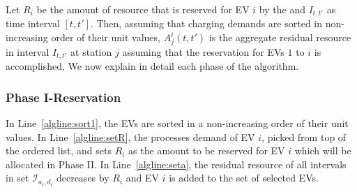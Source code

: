 Let $R_i$ be the amount of resource that is reserved for EV $i$ by the \fcs and $I_{t,t'}$ as time interval $[t,t']$.
Then, assuming that charging demands are sorted in non-increasing order of their unit values, $A^i_j(t,t')$ is the aggregate residual resource in interval $I_{t,t'}$ at station $j$ assuming that the reservation for EVs $1$ to $i$ is accomplished. We now explain in detail each phase of the algorithm. 


\subsubsection{Phase I-Reservation\label{sec:ph1}} In Line~\ref{algline:sort1}, the EVs are sorted in a non-increasing order of their unit values.  
In Line~\ref{algline:setR}, the \fcs processes demand of EV $i$, picked from top of the ordered list, and sets $R_i$ as the amount to be reserved for EV $i$ which will be allocated in Phase II. In Line~\ref{algline:seta}, the residual resource of all intervals in set $\mathcal{I}_{a_i,d_i}$ decreases by $R_i$ and EV $i$ is added to the set of selected EVs.


